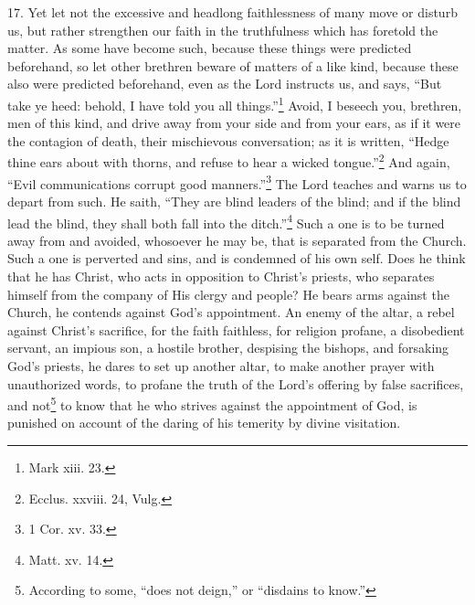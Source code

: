 17. Yet let not the excessive and headlong faithlessness of many move or disturb us, but rather strengthen our faith in the truthfulness which has foretold the matter. As some have become such, because these things were predicted beforehand, so let other brethren beware of matters of a like kind, because these also were predicted beforehand, even as the Lord instructs us, and says, “But take ye heed: behold, I have told you all things.”\footnote{Mark xiii. 23.} Avoid, I beseech you, brethren, men of this kind, and drive away from your side and from your ears, as if it were the contagion of death, their mischievous conversation; as it is written, “Hedge thine ears about with thorns, and refuse to hear a wicked tongue.”\footnote{Ecclus. xxviii. 24, Vulg.} And again, “Evil communications corrupt good manners.”\footnote{1 Cor. xv. 33.} The Lord teaches and warns us to depart from such. He saith, “They are blind leaders of the blind; and if the blind lead the blind, they shall both fall into the ditch.”\footnote{Matt. xv. 14.} Such a one is to be turned away from and avoided, whosoever he may be, that is separated from the Church. Such a one is perverted and sins, and is condemned of his own self. Does he think that he has Christ, who acts in opposition to Christ’s priests, who separates himself from the company of His clergy and people? He bears arms against the Church, he contends against God’s appointment. An enemy of the altar, a rebel against Christ’s sacrifice, for the faith faithless, for religion profane, a disobedient servant, an impious son, a hostile brother, despising the bishops, and forsaking God’s priests, he dares to set up another altar, to make another prayer with unauthorized words, to profane the truth of the Lord’s offering by false sacrifices, and not\footnote{According to some, “does not deign,” or “disdains to know.”} to know that he who strives against the appointment of God, is punished on account of the daring of his temerity by divine visitation.

